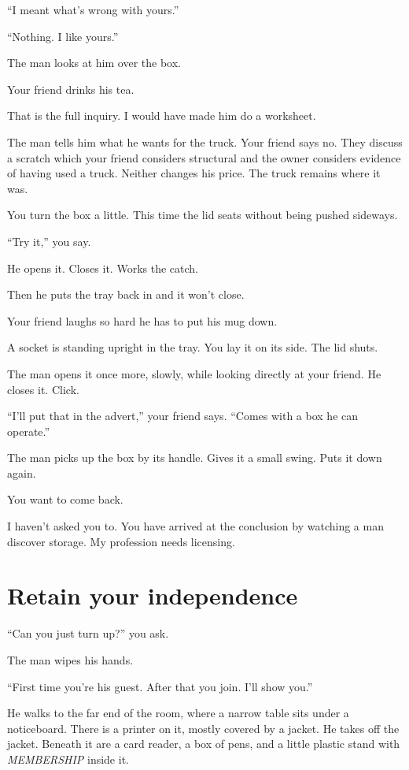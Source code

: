 \documentclass[11pt,oneside]{book}
\begin{document}
``I meant what's wrong with yours.''

``Nothing. I like yours.''

The man looks at him over the box.

Your friend drinks his tea.

That is the full inquiry. I would have made him do a worksheet.

The man tells him what he wants for the truck. Your friend says no. They discuss a scratch which your friend considers structural and the owner considers evidence of having used a truck. Neither changes his price. The truck remains where it was.

You turn the box a little. This time the lid seats without being pushed sideways.

``Try it,'' you say.

He opens it. Closes it. Works the catch.

Then he puts the tray back in and it won't close.

Your friend laughs so hard he has to put his mug down.

A socket is standing upright in the tray. You lay it on its side. The lid shuts.

The man opens it once more, slowly, while looking directly at your friend. He closes it. Click.

``I'll put that in the advert,'' your friend says. ``Comes with a box he can operate.''

The man picks up the box by its handle. Gives it a small swing. Puts it down again.

You want to come back.

I haven't asked you to. You have arrived at the conclusion by watching a man discover storage. My profession needs licensing.

\section*{Retain your independence}

``Can you just turn up?'' you ask.

The man wipes his hands.

``First time you're his guest. After that you join. I'll show you.''

He walks to the far end of the room, where a narrow table sits under a noticeboard. There is a printer on it, mostly covered by a jacket. He takes off the jacket. Beneath it are a card reader, a box of pens, and a little plastic stand with \emph{MEMBERSHIP} inside it.
\end{document}
